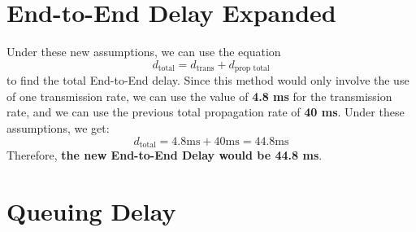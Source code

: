\documentclass{article}
\begin{document}
\section{End-to-End Delay Expanded}
Under these new assumptions, we can use the equation
\[
d_{\text{total}} = d_{\text{trans}} + d_{\text{prop total}} 
\]
to find the total End-to-End delay. Since this method would only involve the use of one transmission rate, we can use the value of \textbf{4.8 ms} for the transmission rate, and we can use the previous total propagation rate of \textbf{40 ms}. Under these assumptions, we get:
\[
d_{\text{total}} = 4.8 \text{ms} + 40 \text{ms} = 44.8 \text{ms} 
\]
Therefore, \textbf{the new End-to-End Delay would be 44.8 ms}.

\section{Queuing Delay}
\end{document}
